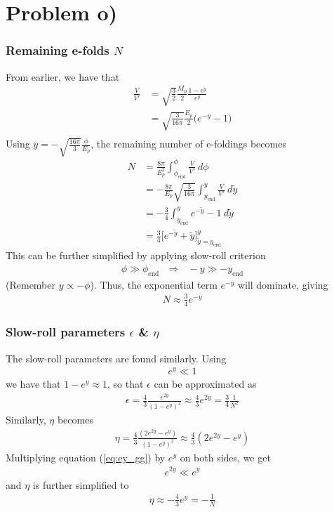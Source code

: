 \documentclass[reprint,english,notitlepage]{revtex4-1}  %
\numberwithin{equation}{section}
\begin{document}
\section{Problem o)}
\subsubsection{Remaining e-folds $N$}
From earlier, we have that
\begin{align}
	\frac{V}{V'} &= \sqrt{\frac{3}{2}}\frac{M_p}{2} \frac{1-e^y}{e^y} \\
							 &= \sqrt{\frac{3}{16\pi}}\frac{E_p}{2} \bigg( e^{-y} -1 \bigg) \\
\end{align}
Using $y=-\sqrt{\frac{16\pi}{3}} \frac{\phi}{E_p}$, the remaining number of
e-foldings becomes
\begin{align}
	N &= \frac{8\pi}{E_p^2} \int_{\phi_{\mathrm{end}}}^\phi \frac{V}{V'}\ d\phi \\
		&= -\frac{8\pi}{E_p} \sqrt{\frac{3}{16\pi}}\int_{y_{\mathrm{end}}}^y \frac{V}{V'}\ d\tilde{y} \\
		&= -\frac{3}{4}\int_{y_{\mathrm{end}}}^y e^{-\tilde{y}} -1\ d\tilde{y} \\
		&= \frac{3}{4}\bigg[ e^{-\tilde{y}} + \tilde{y}\bigg]_{\tilde{y}=y_{\mathrm{end}}}^y
\end{align}
This can be further simplified by applying slow-roll criterion
\begin{align}
	\phi \gg \phi_{\mathrm{end}} \ \ \ \Rightarrow \ \ \ -y \gg -y_{\mathrm{end}}
\end{align}
(Remember $y\propto-\phi$). Thus, the exponential term $e^{-y}$ will dominate, giving
\begin{align}
	N \approx \frac{3}{4} e^{-y}
\end{align}

\subsubsection{Slow-roll parameters $\epsilon$ \& $\eta$}
The slow-roll parameters are found similarly. Using
\begin{align}
	e^y \ll 1	\label{eq:ey_gg}
\end{align}
we have that $1-e^y\approx 1$, so that $\epsilon$ can be approximated as
\begin{align}
	\epsilon = \frac{4}{3} \frac{e^{2y}}{(1-e^y)^2}
		 \approx \frac{4}{3} e^{2y}
		 = \frac{3}{4}\frac{1}{N^2}
\end{align}
Similarly, $\eta$ becomes
\begin{align}
	\eta = \frac{4}{3} \frac{(2e^{2y} - e^y)}{(1-e^y)^2}
		 \approx \frac{4}{3} (2e^{2y} - e^y)
\end{align}
Multiplying equation (\ref{eq:ey_gg}) by $e^y$ on both sides, we get
\begin{align}
	e^{2y} \ll e^y
\end{align}
and $\eta$ is further simplified to
\begin{align}
	\eta \approx -\frac{4}{3}e^y = -\frac{1}{N}
\end{align}
\end{document}
